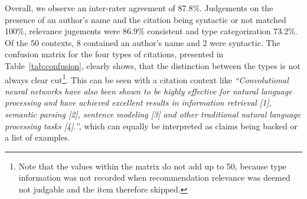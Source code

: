 Overall, we observe an inter-rater agreement of 87.8\%. Judgements on the presence of an author's name and the citation being syntactic or not matched 100\%, relevance jugements were 86.9\% consistent and type categorization 73.2\%. Of the 50 contexts, 8 contained an author's name and 2 were syntactic. The confusion matrix for the four types of citations, presented in Table~\ref{tab:confusion}, clearly shows, that the distinction between the types is not always clear cut\footnote{Note that the values within the matrix do not add up to 50, because type information was not recorded when recommendation relevance was deemed not judgable and the item therefore skipped.}. This can be seen with a citation context like \emph{``Convolutional neural networks have also been shown to be highly effective for natural language processing and have achieved excellent results in information retrieval [1], semantic parsing [2], sentence modeling [3] and other traditional natural language processing tasks [4].''}, which can equally be interpreted as claims being backed or a list of examples.


